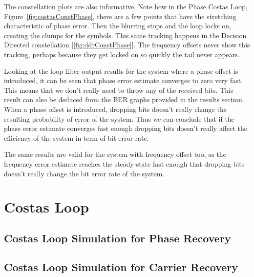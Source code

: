 \documentclass[]{article}
\begin{document}
The constellation plots are also informative.  Note how in the Phase Costas Loop, Figure~\ref{fig:costasConstPhase}, there are a few points that have the stretching characteristic of phase error.  Then the blurring stops and the loop locks on, creating the clumps for the symbols.  This same tracking happens in the Decision Directed constellation [\ref{fig:ddrConstPhase}].  The frequency offsets never show this tracking, perhaps because they get locked on so quickly the tail never appears.

Looking at the loop filter output results for the system where a phase offset is introduced, it can be seen that phase error estimate converges to zero very fast. This means that we don't really need to throw any of the received bits. This result can also be deduced from the BER graphs provided in the results section. When a phase offset is introduced, dropping bits doesn't really change the resulting probability of error of the system. Thus we can conclude that if the phase error estimate converges fast enough dropping bits doesn't really affect the efficiency of the system in term of bit error rate. 

The same results are valid for the system with frequency offset too, as the frequency error estimate reaches the steady-state fast enough that dropping bits doesn't really change the bit error rate of the system. 

\appendix
\newpage


\newpage
%

\section{Costas Loop}
\subsection{Costas Loop Simulation for Phase Recovery}


\subsection{Costas Loop Simulation for Carrier Recovery}

\end{document}
